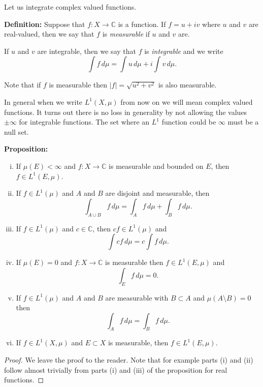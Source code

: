 \documentclass[12pt]{book}
\newcommand{\abs}[1]{\left\lvert {#1} \right\rvert}
\newcommand{\C}{{\mathbb{C}}}
\theoremstyle{plain}
\theoremstyle{remark}
\theoremstyle{definition}
\theoremstyle{exercise}
\theoremstyle{example}
\begin{document}
\medskip

Let us integrate complex valued functions.

\medskip

\textbf{Definition:}
Suppose that $f \colon X \to \C$ is a function.
If $f = u+iv$ where $u$ and $v$ are real-valued, then we say
that $f$ is \emph{measurable} if $u$ and $v$ are.

If $u$ and $v$ are integrable, then we say that $f$ is \emph{integrable}
and we write
$$
\int f \, d\mu = \int u \,d\mu + i \int v \,d\mu .
$$

\medskip

Note that
if $f$ is measurable then $\abs{f} = \sqrt{u^2+v^2}$ is also measurable.

In general when we write $L^1(X,\mu)$ from now on we will mean complex valued
functions.  It turns out there is no loss in generality by not allowing the
values $\pm\infty$ for integrable functions.  The set where an $L^1$
function could be $\infty$ must be a null set.

\medskip

\textbf{Proposition:}
\begin{enumerate}[(i)]
\item 
If $\mu(E) < \infty$ and $f \colon X \to \C$ is measurable and bounded on $E$, then $f \in
L^1(E,\mu)$.
\item If $f \in L^1(\mu)$ and $A$ and $B$ are
disjoint and measurable, then
$$
\int_{A \cup B} f \, d\mu =
\int_{A} f \, d\mu +
\int_{B} f \, d\mu.
$$
\item If $f \in L^1(\mu)$ and $c \in \C$, then $cf \in L^1(\mu)$ and
$$
\int cf \, d\mu = c \int f \, d\mu .
$$
\item If $\mu(E) = 0$ and $f \colon X \to \C$ is measurable then $f \in L^1(E,\mu)$ and
$$
\int_E f \, d\mu = 0 .
$$
\item If $f \in L^1(\mu)$ and $A$ and $B$ are measurable with $B \subset A$
and $\mu(A \setminus B) = 0$ then
$$
\int_A f \, d\mu = \int_B f \, d\mu .
$$
\item If $f \in L^1(X,\mu)$ and $E \subset X$ is measurable, then
$f \in L^1(E,\mu)$.
\end{enumerate}

\medskip

\begin{proof}
We leave the proof to the reader.
Note that for example parts (i) and (ii) follow almost trivially from parts (i) and
(iii) of the proposition for real functions.
\end{proof}
\end{document}
